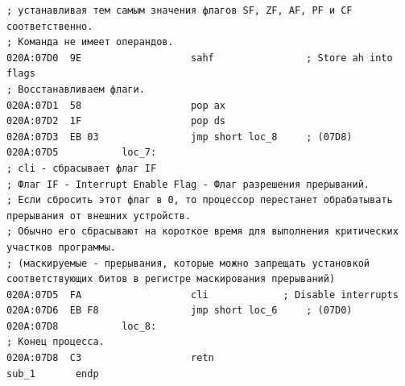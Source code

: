 \begin{lstlisting}[label=some-code,caption=Код подпрограммы sub\_1]
; устанавливая тем самым значения флагов SF, ZF, AF, PF и CF соответственно. 
; Команда не имеет операндов.
020A:07D0  9E					sahf				; Store ah into flags
; Восстанавливаем флаги.
020A:07D1  58					pop	ax
020A:07D2  1F					pop	ds
020A:07D3  EB 03				jmp	short loc_8		; (07D8)
020A:07D5			loc_7:
; cli - сбрасывает флаг IF
; Флаг IF - Interrupt Enable Flag - Флаг разрешения прерываний.
; Если сбросить этот флаг в 0, то процессор перестанет обрабатывать прерывания от внешних устройств.
; Обычно его сбрасывают на короткое время для выполнения критических участков программы.
; (маскируемые - прерывания, которые можно запрещать установкой соответствующих битов в регистре маскирования прерываний)
020A:07D5  FA					cli				; Disable interrupts
020A:07D6  EB F8				jmp	short loc_6		; (07D0)
020A:07D8			loc_8:
; Конец процесса.
020A:07D8  C3					retn
sub_1		endp
\end{lstlisting}


\begin{figure}[ht!]
\end{figure}


